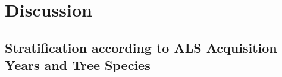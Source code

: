 
\section{Discussion}
\label{sec:Dis}

\subsection{Stratification according to ALS Acquisition Years and Tree Species}
\label{sec:strat_dis}

